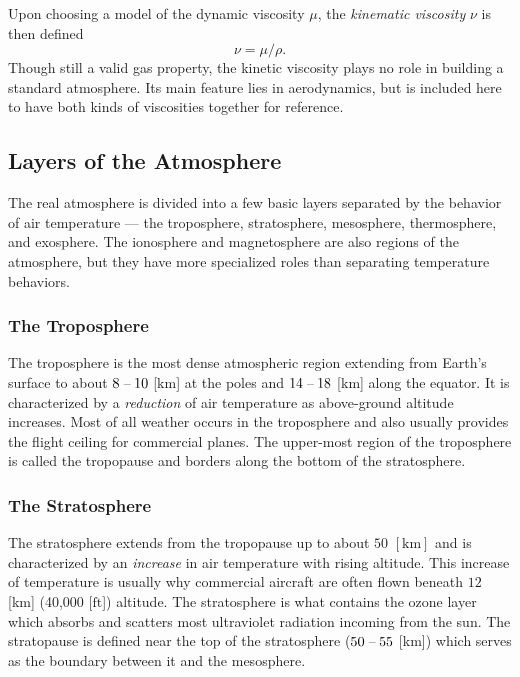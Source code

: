 \documentclass[11pt,dvipsnames]{thesis}
\begin{document}
Upon choosing a model of the dynamic viscosity $\mu$, the \textit{kinematic viscosity} $\nu$ is then defined
\begin{equation}
\nu = \mu / \rho. \label{eq:KinetmaticViscosityDef}
\end{equation}
Though still a valid gas property, the kinetic viscosity plays no role in building a standard atmosphere. Its main feature lies in aerodynamics, but is included here to have both kinds of viscosities together for reference.

\subsection{Layers of the Atmosphere}
The real atmosphere is divided into a few basic layers separated by the behavior of air temperature --- the troposphere, stratosphere, mesosphere, thermosphere, and exosphere. The ionosphere and magnetosphere are also regions of the atmosphere, but they have more specialized roles than separating temperature behaviors.
\subsubsection{The Troposphere}
The troposphere is the most dense atmospheric region extending from Earth's surface to about $8\hspace{0.5ex}$--$\hspace{0.4ex}10$ [\si{\km}] at the poles and $14\hspace{0.5ex}$--$\hspace{0.5ex}18$ [\si{\km}] along the equator. It is characterized by a \textit{reduction} of air temperature as above-ground altitude increases. Most of all weather occurs in the troposphere and also usually provides the flight ceiling for commercial planes. The upper-most region of the troposphere is called the tropopause and borders along the bottom of the stratosphere.

\subsubsection{The Stratosphere}
The stratosphere extends from the tropopause up to about $50$ $[\si{\km}]$ and is characterized by an \textit{increase} in air temperature with rising altitude. This increase of temperature is usually why commercial aircraft are often flown beneath $12$ [\si{\km}] (40,000 [$\mathrm{ft}$]) altitude. The stratosphere is what contains the ozone layer which absorbs and scatters most ultraviolet radiation incoming from the sun. The stratopause is defined near the top of the stratosphere ($50\hspace{0.5ex}$--$\hspace{0.5ex}55$ [\si{\km}]) which serves as the boundary between it and the mesosphere.
\end{document}
